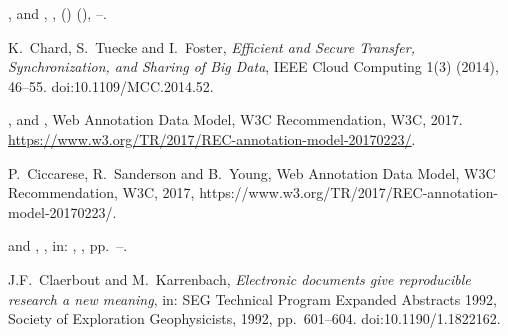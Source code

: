 \documentclass[ds,v1.1.2,openaccess]{iosart2x}%
\begin{document}
\begin{thebibliography}{}
%
\begin{barticle}
,
 and
,
,
()
(),
--.
\end{barticle}
%
\OrigBibText
K.~Chard,
S.~Tuecke and
I.~Foster,
\textit{Efficient and Secure Transfer, Synchronization, and Sharing of Big
Data},
IEEE Cloud Computing
1(3)
(2014),
46--55.
doi:10.1109/MCC.2014.52.
\endOrigBibText
{}
\endbibitem

%
\begin{botherref}
,
 and
,
Web Annotation Data Model, {W3C} Recommendation,
W3C,
2017.
\url{https://www.w3.org/TR/2017/REC-annotation-model-20170223/}.
\end{botherref}
%
\OrigBibText
P.~Ciccarese,
R.~Sanderson and
B.~Young,
Web Annotation Data Model,
{W3C} Recommendation,
W3C,
2017,
https://www.w3.org/TR/2017/REC-annotation-model-20170223/.
\endOrigBibText
{}
\endbibitem

%
\begin{bchapter}
 and
,
,
in: ,
,
pp.~--.
\end{bchapter}
%
\OrigBibText
J.F.~Claerbout and
M.~Karrenbach,
\textit{Electronic documents give reproducible research a new meaning},
in: {SEG} Technical Program Expanded Abstracts 1992,
Society of Exploration Geophysicists,
1992,
pp.~601--604.
doi:10.1190/1.1822162.
\endOrigBibText
{}
\endbibitem


\end{thebibliography}
\end{document}
